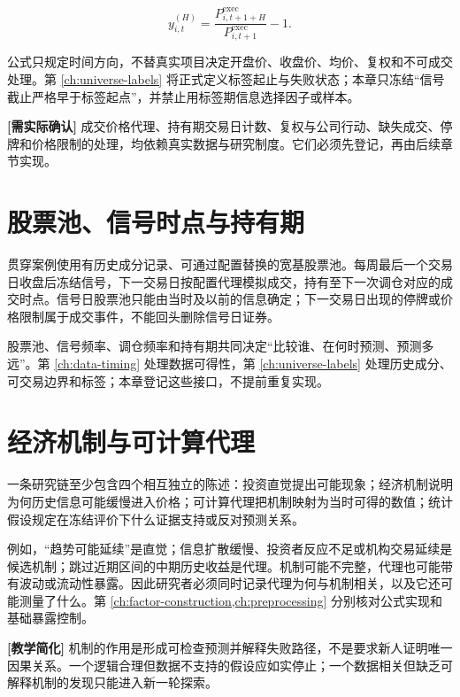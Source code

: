 \begin{equation}
  y_{i,t}^{(H)}
  = \frac{P^{\mathrm{exec}}_{i,t+1+H}}
           {P^{\mathrm{exec}}_{i,t+1}} - 1.
  \label{eq:ch01-forward-label}
\end{equation}

公式只规定时间方向，不替真实项目决定开盘价、收盘价、均价、复权和不可成交处理。第 \cref{ch:universe-labels} 将正式定义标签起止与失败状态；本章只冻结“信号截止严格早于标签起点”，并禁止用标签期信息选择因子或样本。

\begin{confirmbox}
\textbf{[需实际确认]} 成交价格代理、持有期交易日计数、复权与公司行动、缺失成交、停牌和价格限制的处理，均依赖真实数据与研究制度。它们必须先登记，再由后续章节实现。
\end{confirmbox}

\section{股票池、信号时点与持有期}

贯穿案例使用有历史成分记录、可通过配置替换的宽基股票池。每周最后一个交易日收盘后冻结信号，下一交易日按配置代理模拟成交，持有至下一次调仓对应的成交时点。信号日股票池只能由当时及以前的信息确定；下一交易日出现的停牌或价格限制属于成交事件，不能回头删除信号日证券。

股票池、信号频率、调仓频率和持有期共同决定“比较谁、在何时预测、预测多远”。第 \cref{ch:data-timing} 处理数据可得性，第 \cref{ch:universe-labels} 处理历史成分、可交易边界和标签；本章登记这些接口，不提前重复实现。

\section{经济机制与可计算代理}

一条研究链至少包含四个相互独立的陈述：投资直觉提出可能现象；经济机制说明为何历史信息可能缓慢进入价格；可计算代理把机制映射为当时可得的数值；统计假设规定在冻结评价下什么证据支持或反对预测关系。

例如，“趋势可能延续”是直觉；信息扩散缓慢、投资者反应不足或机构交易延续是候选机制；跳过近期区间的中期历史收益是代理。机制可能不完整，代理也可能带有波动或流动性暴露。因此研究者必须同时记录代理为何与机制相关，以及它还可能测量了什么。第 \cref{ch:factor-construction,ch:preprocessing} 分别核对公式实现和基础暴露控制。

\begin{teachingbox}
\textbf{[教学简化]} 机制的作用是形成可检查预测并解释失败路径，不是要求新人证明唯一因果关系。一个逻辑合理但数据不支持的假设应如实停止；一个数据相关但缺乏可解释机制的发现只能进入新一轮探索。
\end{teachingbox}

